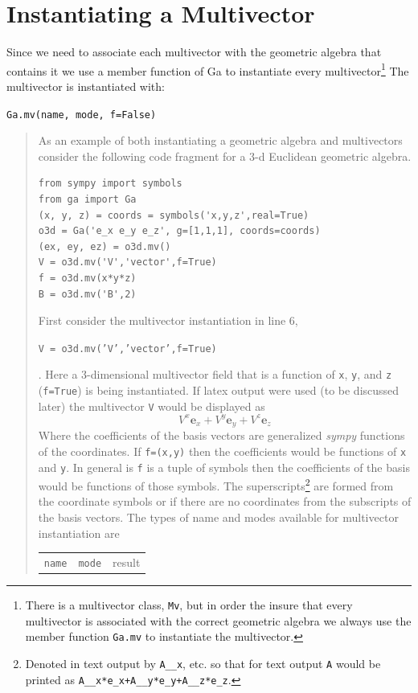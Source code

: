 \documentclass[12pt]{report}
\newcommand{\bm}[1]{\boldsymbol{#1}}
\newcommand{\be}{\begin{equation}}
\newcommand{\ee}{\end{equation}}
\newcommand{\eb}{\bm{e}}
\newcommand{\T}[1]{\texttt{#1}}
\begin{document}
\section{Instantiating a Multivector}\label{makeMV}

Since we need to associate each multivector with the geometric algebra that contains it
we use a member function of Ga to instantiate every multivector\footnote{There is a
multivector class, \T{Mv}, but in order the insure that every multivector is associated
with the correct geometric algebra we always use the member function \T{Ga.mv} to instantiate
the multivector.}  The multivector is instantiated with:

\T{Ga.mv(name, mode, f=False)}
\begin{quote}
As an example of both instantiating a geometric algebra and multivectors consider the
following code fragment for a 3-d Euclidean geometric algebra.
\begin{lstlisting}
from sympy import symbols
from ga import Ga
(x, y, z) = coords = symbols('x,y,z',real=True)
o3d = Ga('e_x e_y e_z', g=[1,1,1], coords=coords)
(ex, ey, ez) = o3d.mv()
V = o3d.mv('V','vector',f=True)
f = o3d.mv(x*y*z)
B = o3d.mv('B',2)
\end{lstlisting}
First consider the multivector instantiation in line 6,\newline
\centerline{\T{V = o3d.mv('V','vector',f=True)}}.\newline
Here
a 3-dimensional multivector field that is a function of \T{x}, \T{y}, and \T{z} (\T{f=True}) is
being instantiated.  If latex output were used (to be discussed later) the multivector
\T{V} would be displayed as
\be
    V^{x}\eb_{x} + V^{y}\eb_{y} + V^{z}\eb_{z}
\ee
Where the coefficients of the basis vectors are generalized \emph{sympy} functions of the
coordinates.  If \T{f=(x,y)} then the coefficients would be functions of \T{x} and \T{y}. 
In general is \T{f} is a tuple of symbols then the coefficients of the basis would be functions of those
symbols.  The superscripts\footnote{Denoted in text output by \T{A\_\_x}, etc. so
that for text output \T{A} would be printed as \T{A\_\_x*e\_x+A\_\_y*e\_y+A\_\_z*e\_z}.} are formed
from the coordinate symbols or if there are no coordinates from the subscripts of
the basis vectors.  The types of name and modes available for multivector instantiation are
\begin{center}
   \begin{tabular}{ccc}
    \T{name} &  \T{mode}  &  result \\

\end{tabular}
\end{center}
\end{quote}
\end{document}
